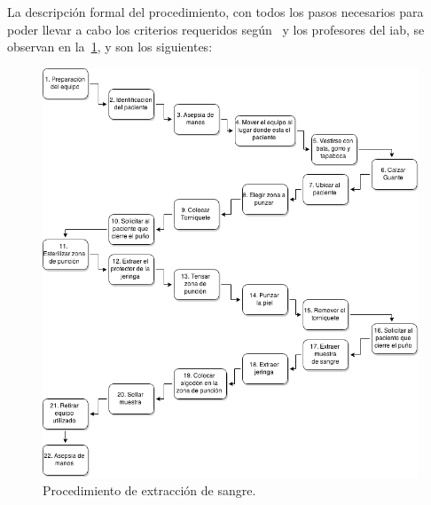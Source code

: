 La descripción formal del procedimiento, con todos los pasos necesarios
para poder llevar a cabo los criterios requeridos según~\cite{oms:extraccion}
y los profesores del \Gls{iab}, se observan en la~\ref{fig:proc_hemocultivo}, y
son los siguientes:

\begin{figure}
\centering
\includegraphics[scale=0.5]{requerimientos/images/hemocultivo.png}
\caption{Procedimiento de extracción de sangre.}
\label{fig:proc_hemocultivo}
\end{figure}

